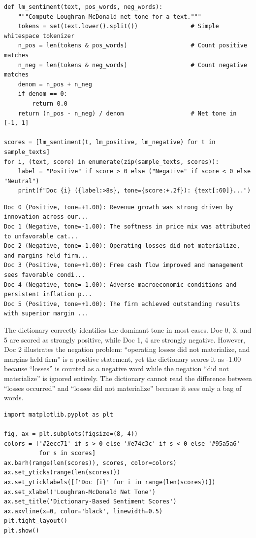 \begin{verbatim}
def lm_sentiment(text, pos_words, neg_words):
    """Compute Loughran-McDonald net tone for a text."""
    tokens = set(text.lower().split())               # Simple whitespace tokenizer
    n_pos = len(tokens & pos_words)                  # Count positive matches
    n_neg = len(tokens & neg_words)                  # Count negative matches
    denom = n_pos + n_neg
    if denom == 0:
        return 0.0
    return (n_pos - n_neg) / denom                   # Net tone in [-1, 1]

scores = [lm_sentiment(t, lm_positive, lm_negative) for t in sample_texts]
for i, (text, score) in enumerate(zip(sample_texts, scores)):
    label = "Positive" if score > 0 else ("Negative" if score < 0 else "Neutral")
    print(f"Doc {i} ({label:>8s}, tone={score:+.2f}): {text[:60]}...")
\end{verbatim}

\begin{verbatim}
Doc 0 (Positive, tone=+1.00): Revenue growth was strong driven by innovation across our...
Doc 1 (Negative, tone=-1.00): The softness in price mix was attributed to unfavorable cat...
Doc 2 (Negative, tone=-1.00): Operating losses did not materialize, and margins held firm...
Doc 3 (Positive, tone=+1.00): Free cash flow improved and management sees favorable condi...
Doc 4 (Negative, tone=-1.00): Adverse macroeconomic conditions and persistent inflation p...
Doc 5 (Positive, tone=+1.00): The firm achieved outstanding results with superior margin ...
\end{verbatim}

The dictionary correctly identifies the dominant tone in most cases. Doc 0, 3, and 5 are scored as strongly positive, while Doc 1, 4 are strongly negative. However, Doc 2 illustrates the negation problem: ``operating losses did not materialize, and margins held firm'' is a positive statement, yet the dictionary scores it as -1.00 because ``losses'' is counted as a negative word while the negation ``did not materialize'' is ignored entirely. The dictionary cannot read the difference between ``losses occurred'' and ``losses did not materialize'' because it sees only a bag of words.

\begin{verbatim}
import matplotlib.pyplot as plt

fig, ax = plt.subplots(figsize=(8, 4))
colors = ['#2ecc71' if s > 0 else '#e74c3c' if s < 0 else '#95a5a6'
          for s in scores]
ax.barh(range(len(scores)), scores, color=colors)
ax.set_yticks(range(len(scores)))
ax.set_yticklabels([f'Doc {i}' for i in range(len(scores))])
ax.set_xlabel('Loughran-McDonald Net Tone')
ax.set_title('Dictionary-Based Sentiment Scores')
ax.axvline(x=0, color='black', linewidth=0.5)
plt.tight_layout()
plt.show()
\end{verbatim}

